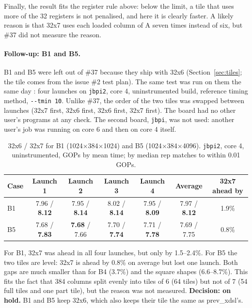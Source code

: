 \documentclass[11pt,a4paper]{article}
\newcommand{\good}[1]{\textcolor{green!45!black}{\textbf{#1}}}
\begin{document}
Finally, the result fits the register rule above: below the limit, a tile that uses more of the 32 registers
is not penalised, and here it is clearly faster. A likely reason is that 32x7 uses each loaded column of A seven
times instead of six, but \#37 did not measure the reason.

\paragraph{Follow-up: B1 and B5.}
\label{sec:b1b5}
B1 and B5 were left out of \#37 because they ship with 32x6 (Section~\ref{sec:tiles}; the tile comes
from the issue \#2 test plan). The same test was run on them the same day \cite{b1b5}: four launches on \texttt{jbpi2},
core 4, uninstrumented build, reference timing method, \texttt{-{}-tmin 10}. Unlike \#37, the order of the two
tiles was swapped between launches (32x7 first, 32x6 first, 32x6 first, 32x7 first). The board had no other
user's programs at any check. The second board, \texttt{jbpi}, was not used: another user's job was running
on core 6 and then on core 4 itself.

\begin{table}[h]
\centering\small
\begin{tabular}{@{}lcccccc@{}}
\toprule
\textbf{Case} & \textbf{Launch 1} & \textbf{Launch 2} & \textbf{Launch 3} & \textbf{Launch 4} & \textbf{Average} &
\textbf{32x7 ahead by} \\
\midrule
B1 & 7.96 / \good{8.12} & 7.95 / \good{8.14} & 8.02 / \good{8.14} & 7.95 / \good{8.09} & 7.97 / \good{8.12} & 1.9\% \\
B5 & 7.68 / \good{7.83} & \good{7.68} / 7.66 & 7.70 / \good{7.74} & 7.71 / \good{7.78} & 7.69 / 7.75 & 0.8\% \\
\bottomrule
\end{tabular}
\caption{32x6 / 32x7 for B1 (1024$\times$384$\times$1024) and B5 (1024$\times$384$\times$4096).
\texttt{jbpi2}, core 4, uninstrumented, GOPs by mean time; by median rep matches to within 0.01 GOPs.}
\label{tab:b1b5}
\end{table}

For B1, 32x7 was ahead in all four launches, but only by 1.5--2.4\%. For B5 the two tiles are level: 32x7 is
ahead by 0.8\% on average but lost one launch. Both gaps are much smaller than for B4 (3.7\%) and the square
shapes (6.6--8.7\%). This fits the fact that 384 columns split evenly into tiles of 6 (64 tiles) but not of 7
(54 full tiles and one part tile), but the reason was not measured. \textbf{Decision: on hold.} B1 and B5 keep
32x6, which also keeps their tile the same as prev\_xdsl's.
\end{document}
